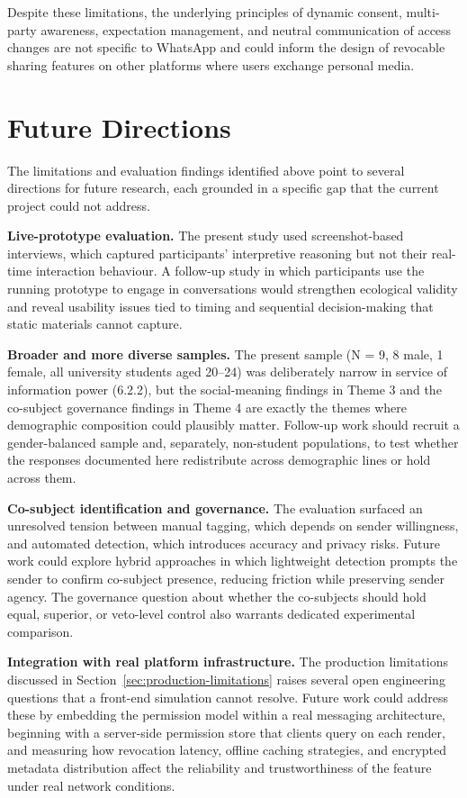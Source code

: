 Despite these limitations, the underlying principles of dynamic consent, multi-party awareness, expectation management, and neutral communication of access changes are not specific to WhatsApp and could inform the design of revocable sharing features on other platforms where users exchange personal media.

\section{Future Directions} \label{sec:future-directions}

The limitations and evaluation findings identified above point to several directions for future research, each grounded in a specific gap that the current project could not address.

\textbf{Live-prototype evaluation.} The present study used screenshot-based interviews, which captured participants' interpretive reasoning but not their real-time interaction behaviour. A follow-up study in which participants use the running prototype to engage in conversations would strengthen ecological validity and reveal usability issues tied to timing and sequential decision-making that static materials cannot capture.

\textbf{Broader and more diverse samples.} The present sample (N = 9, 8 male, 1 female, all university students aged 20–24) was deliberately narrow in service of information power (6.2.2), but the social-meaning findings in Theme 3 and the co-subject governance findings in Theme 4 are exactly the themes where demographic composition could plausibly matter. Follow-up work should recruit a gender-balanced sample and, separately, non-student populations, to test whether the responses documented here redistribute across demographic lines or hold across them.   

\textbf{Co-subject identification and governance.} The evaluation surfaced an unresolved tension between manual tagging, which depends on sender willingness, and automated detection, which introduces accuracy and privacy risks. Future work could explore hybrid approaches in which lightweight detection prompts the sender to confirm co-subject presence, reducing friction while preserving sender agency. The governance question about whether the co-subjects should hold equal, superior, or veto-level control also warrants dedicated experimental comparison.

\textbf{Integration with real platform infrastructure.} The production limitations discussed in Section~\ref{sec:production-limitations} raises several open engineering questions that a front-end simulation cannot resolve. Future work could address these by embedding the permission model within a real messaging architecture, beginning with a server-side permission store that clients query on each render, and measuring how revocation latency, offline caching strategies, and encrypted metadata distribution affect the reliability and trustworthiness of the feature under real network conditions.

